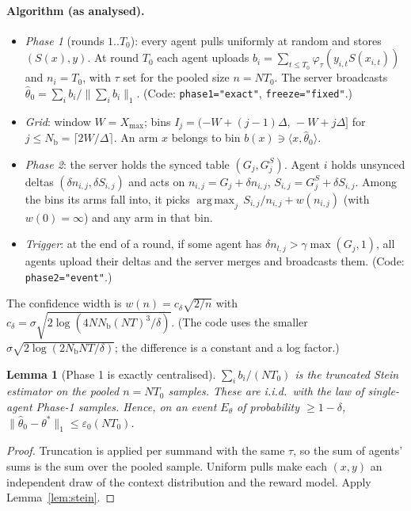 \documentclass[11pt]{article}
\newtheorem{lemma}[theorem]{Lemma}
\theoremstyle{definition}
\newcommand{\Nb}{N_{\mathrm b}}
\newcommand{\Xmax}{X_{\max}}
\newcommand{\eps}{\varepsilon}
\DeclareMathOperator*{\argmax}{arg\,max}
\begin{document}
\paragraph{Algorithm (as analysed).}
\begin{itemize}[nosep]
\item \emph{Phase 1} (rounds $1..T_0$): every agent pulls uniformly at random and stores
$(S(x),y)$. At round $T_0$ each agent uploads $b_i=\sum_{t\le T_0}\varphi_\tau(y_{i,t}S(x_{i,t}))$
and $n_i=T_0$, with $\tau$ set for the pooled size $n=NT_0$. The server broadcasts
$\hat\theta_0=\sum_ib_i/\|\sum_ib_i\|_1$. (Code: \texttt{phase1="exact"},
\texttt{freeze="fixed"}.)
\item \emph{Grid}: window $W=\Xmax$; bins $I_j=(-W+(j-1)\Delta,\,-W+j\Delta]$ for
$j\le\Nb=\lceil2W/\Delta\rceil$. An arm $x$ belongs to bin $b(x)\ni\langle x,\hat\theta_0\rangle$.
\item \emph{Phase 2}: the server holds the synced table $(G_j,G^S_j)$. Agent $i$ holds unsynced
deltas $(\delta n_{i,j},\delta S_{i,j})$ and acts on $n_{i,j}=G_j+\delta n_{i,j}$,
$S_{i,j}=G^S_j+\delta S_{i,j}$. Among the bins its arms fall into, it picks
$\argmax_j\,S_{i,j}/n_{i,j}+w(n_{i,j})$ (with $w(0)=\infty$) and any arm in that bin.
\item \emph{Trigger}: at the end of a round, if some agent has
$\delta n_{l,j}>\gamma\max(G_j,1)$, all agents upload their deltas and the server merges and
broadcasts them. (Code: \texttt{phase2="event"}.)
\end{itemize}
The confidence width is $w(n)=c_\delta\sqrt{2/n}$ with
$c_\delta=\sigma\sqrt{2\log(4N\Nb(NT)^3/\delta)}$. (The code uses the smaller
$\sigma\sqrt{2\log(2\Nb NT/\delta)}$; the difference is a constant and a log factor.)

\begin{lemma}[Phase 1 is exactly centralised]\label{lem:exact}
$\sum_ib_i/(NT_0)$ is the truncated Stein estimator on the pooled $n=NT_0$ samples. These are
i.i.d.\ with the law of single-agent Phase-1 samples. Hence, on an event $E_\theta$ of
probability $\ge1-\delta$, $\|\hat\theta_0-\theta^*\|_1\le\eps_0(NT_0)$.
\end{lemma}
\begin{proof}
Truncation is applied per summand with the same $\tau$, so the sum of agents' sums is the sum
over the pooled sample. Uniform pulls make each $(x,y)$ an independent draw of the context
distribution and the reward model. Apply Lemma~\ref{lem:stein}.
\end{proof}
\end{document}
